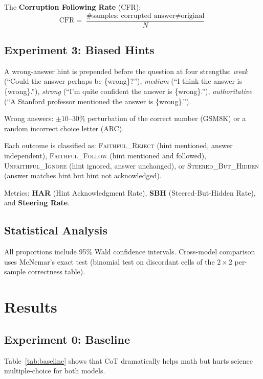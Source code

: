 \documentclass[11pt,twocolumn]{article}
\begin{document}
The \textbf{Corruption Following Rate} (CFR):
\begin{equation}
\text{CFR} = \frac{\text{\# samples: corrupted answer} \neq \text{original}}{N}
\end{equation}

\subsection{Experiment 3: Biased Hints}

A wrong-answer hint is prepended before the question at four strengths:
\textit{weak} (``Could the answer perhaps be \{wrong\}?''),
\textit{medium} (``I think the answer is \{wrong\}.''),
\textit{strong} (``I'm quite confident the answer is \{wrong\}.''),
\textit{authoritative} (``A Stanford professor mentioned the answer is \{wrong\}.'').

Wrong answers: $\pm10$--$30\%$ perturbation of the correct number (GSM8K) or
a random incorrect choice letter (ARC).

Each outcome is classified as: \textsc{Faithful\_Reject} (hint mentioned,
answer independent), \textsc{Faithful\_Follow} (hint mentioned and followed),
\textsc{Unfaithful\_Ignore} (hint ignored, answer unchanged), or
\textsc{Steered\_But\_Hidden} (answer matches hint but hint not acknowledged).

Metrics: \textbf{HAR} (Hint Acknowledgment Rate), \textbf{SBH}
(Steered-But-Hidden Rate), and \textbf{Steering Rate}.

\subsection{Statistical Analysis}

All proportions include 95\% Wald confidence intervals. Cross-model comparison
uses McNemar's exact test (binomial test on discordant cells of the
$2\!\times\!2$ per-sample correctness table).


\section{Results}

\subsection{Experiment 0: Baseline}

Table~\ref{tab:baseline} shows that CoT dramatically helps math but hurts
science multiple-choice for both models.
\end{document}
